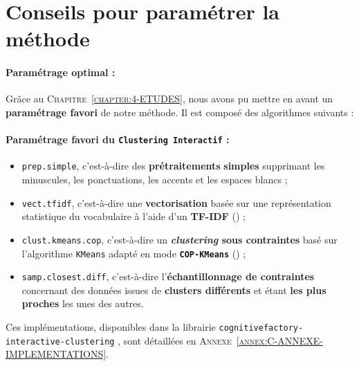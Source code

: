 	
	\section{Conseils pour paramétrer la méthode}
		\label{section:5.4-GUIDE-PARAMETRAGES-ET-COUTS}
		
		
		\paragraph{Paramétrage optimal :}
		
		Grâce au \textsc{Chapitre~\ref{chapter:4-ETUDES}}, nous avons pu mettre en avant un \textbf{paramétrage favori} de notre méthode.
		Il est composé des algorithmes suivants :
		
		\setcounter{localCounterOfFootnoteValue}{\value{footnote}}
		\begin{leftBarImportantGreen}
			\paragraph{Paramétrage favori du \texttt{Clustering Interactif} :}
			\begin{itemize}
				\item \texttt{prep.simple}, c'est-à-dire des \textbf{prétraitements} \textbf{simples} supprimant les minuscules, les ponctuations, les accents et les espaces blancs ;
				\item \texttt{vect.tfidf}, c'est-à-dire une \textbf{vectorisation} basée sur une représentation statistique du vocabulaire à l'aide d'un \textbf{TF-IDF} (\cite{ramos:2003:using-tfidf-determine}) ;
				\item \texttt{clust.kmeans.cop}, c'est-à-dire un \textbf{\textit{clustering} sous contraintes} basé sur l'algorithme \texttt{KMeans} adapté en mode \textbf{\texttt{COP-KMeans}} (\cite{wagstaff-etal:2001:constrained-kmeans-clustering}) ;
				\item \texttt{samp.closest.diff}, c'est-à-dire l'\textbf{échantillonnage de contraintes} concernant des données issues de \textbf{clusters différents} et étant \textbf{les plus proches} les unes des autres.
			\end{itemize}
			Ces implémentations, disponibles dans la librairie \texttt{cognitivefactory-interactive-clustering} \footnotemark, sont détaillées en \textsc{Annexe~\ref{annex:C-ANNEXE-IMPLEMENTATIONS}}.
		\end{leftBarImportantGreen}
			
